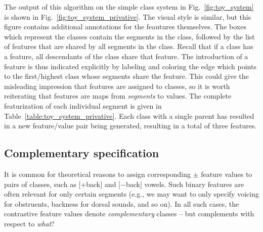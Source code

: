\documentclass[12pt, oneside]{article}   	%
\newcommand{\featmat}[1]
{$[$#1$]$}
\begin{document}
The output of this algorithm on the simple class system in Fig.~\ref{fig:toy_system} is shown in Fig.~\ref{fig:toy_system_privative}. The visual style is similar, but this figure contains additional annotations for the feautures themselves. The boxes which represent the classes contain the segments in the class, followed by the list of features that are shared by all segments in the class. Recall that if a class has a feature, all descendants of the class share that feature. The introduction of a feature is thus indicated explicitly by labeling and coloring the edge which points to the first/highest class whose segments share the feature. This could give the misleading impression that features are assigned to classes, so it is worth reiterating that features are maps from \textit{segments} to values. The complete featurization of each individual segment is given in Table~\ref{table:toy_system_privative}. Each class with a single parent has resulted in a new feature/value pair being generated, resulting in a total of three features.

\FloatBarrier
\subsection{Complementary specification}
\label{sec:contrastiveunder}

It is common for theoretical reasons to assign corresponding $\pm$ feature values to pairs of classes, such as \featmat{+back} and \featmat{$-$back} vowels. Such binary features are often relevant for only certain segments (e.g., we may want to only specify voicing for obstruents, backness for dorsal sounds, and so on). In all such cases, the contrastive feature values denote \textit{complementary} classes -- but complements with respect to \textit{what}?  
\end{document}
